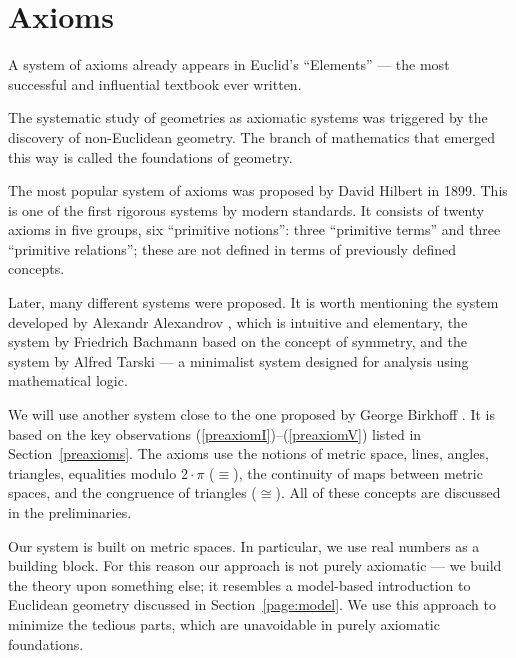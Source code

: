  
\chapter{Axioms}
\label{chap:axioms}

\vfill

A system of axioms already appears in Euclid's ``Elements'' --- the most successful and influential textbook ever written.

The systematic study of geometries as axiomatic systems
 was
triggered by the discovery of non-Euclidean geometry.
The branch of mathematics that emerged this way is called the foundations of geometry.

The most popular system of axioms
was proposed by David Hilbert in 1899.
This is one of the first rigorous systems by modern standards.
It consists of twenty axioms in five groups, six ``primitive notions'': three ``primitive terms'' and three ``primitive relations'';
these are not defined in terms of previously defined concepts.

Later, many different systems were proposed.
It is worth mentioning
the system developed by Alexandr Alexandrov \cite{alexandrov}, which is intuitive and elementary,
the system by Friedrich Bachmann \cite{bachmann} based on the concept of symmetry,
and the system by Alfred Tarski \cite{tarski} --- a minimalist system designed for analysis using mathematical logic.

We will use another system close to the one proposed by George Birkhoff \cite{birkhoff}.
It is based on the key observations (\ref{preaxiomI})--(\ref{preaxiomV}) listed in Section~\ref{preaxioms}.
The axioms use the notions of 
metric space, 
lines, 
angles,
triangles,
equalities modulo $2\cdot\pi$ ($\equiv$), 
the continuity of maps between metric spaces,
and the congruence of triangles ($\cong$).
All of these concepts are discussed in the preliminaries.

Our system is built on metric spaces.
In particular, we use real numbers as a building block. 
For this reason our approach is not purely axiomatic --- we build the theory upon something else;
it resembles a model-based introduction to Euclidean geometry discussed in Section~\ref{page:model}.
We use this approach to minimize the tedious parts, which are unavoidable in purely axiomatic foundations.

